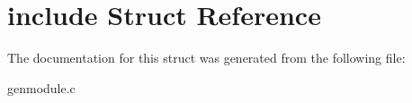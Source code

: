 \hypertarget{structinclude}{\section{include Struct Reference}
\label{structinclude}
}


The documentation for this struct was generated from the following file\-:\begin{DoxyCompactItemize}
\item 
genmodule.\-c\end{DoxyCompactItemize}
